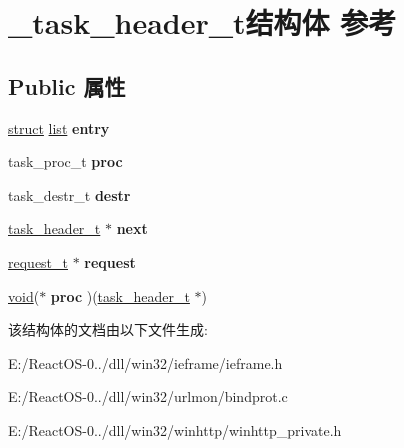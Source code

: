 \hypertarget{struct__task__header__t}{}\section{\+\_\+task\+\_\+header\+\_\+t结构体 参考}
\label{struct__task__header__t}
\subsection*{Public 属性}
\begin{DoxyCompactItemize}
\item 
\mbox{\label{struct__task__header__t_a8147d551f3b6a6f3e1cc7748f5c5e9b4}} 
\hyperlink{interfacestruct}{struct} \hyperlink{classlist}{list} {\bfseries entry}
\item 
\mbox{\label{struct__task__header__t_a40368210a804b9adc130d5146f7d98de}} 
task\+\_\+proc\+\_\+t {\bfseries proc}
\item 
\mbox{\label{struct__task__header__t_ad28a17839c266b9343c024ff74d30e49}} 
task\+\_\+destr\+\_\+t {\bfseries destr}
\item 
\mbox{\label{struct__task__header__t_a9ec041fd53d75861a1f560e8fa13d32d}} 
\hyperlink{structtask__header__t}{task\+\_\+header\+\_\+t} $\ast$ {\bfseries next}
\item 
\mbox{\label{struct__task__header__t_ae19e743ab58da5d94954e994e13e0350}} 
\hyperlink{structrequest__t}{request\+\_\+t} $\ast$ {\bfseries request}
\item 
\mbox{\label{struct__task__header__t_a768627e6ae08ae0010b342d0f155f883}} 
\hyperlink{interfacevoid}{void}($\ast$ {\bfseries proc} )(\hyperlink{structtask__header__t}{task\+\_\+header\+\_\+t} $\ast$)
\end{DoxyCompactItemize}


该结构体的文档由以下文件生成\+:\begin{DoxyCompactItemize}
\item 
E\+:/\+React\+O\+S-\/0../dll/win32/ieframe/ieframe.\+h\item 
E\+:/\+React\+O\+S-\/0../dll/win32/urlmon/bindprot.\+c\item 
E\+:/\+React\+O\+S-\/0../dll/win32/winhttp/winhttp\+\_\+private.\+h\end{DoxyCompactItemize}
